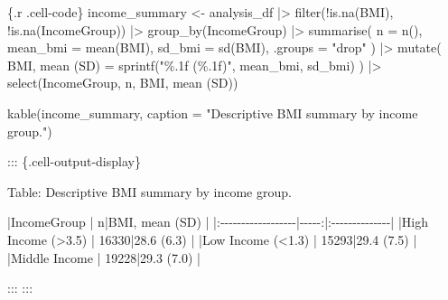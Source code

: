 \documentclass[
  letterpaper,
  DIV=11,
  numbers=noendperiod,
  oneside]{scrreprt}
\newenvironment{Shaded}{\begin{snugshade}}{\end{snugshade}}
\newcommand{\AttributeTok}[1]{\textcolor[rgb]{0.40,0.45,0.13}{#1}}
\newcommand{\FunctionTok}[1]{\textcolor[rgb]{0.28,0.35,0.67}{#1}}
\newcommand{\InformationTok}[1]{\textcolor[rgb]{0.37,0.37,0.37}{#1}}
\newcommand{\NormalTok}[1]{\textcolor[rgb]{0.00,0.23,0.31}{#1}}
\newcommand{\OtherTok}[1]{\textcolor[rgb]{0.00,0.23,0.31}{#1}}
\newcommand{\PreprocessorTok}[1]{\textcolor[rgb]{0.68,0.00,0.00}{#1}}
\newcommand{\SpecialCharTok}[1]{\textcolor[rgb]{0.37,0.37,0.37}{#1}}
\newcommand{\StringTok}[1]{\textcolor[rgb]{0.13,0.47,0.30}{#1}}
\begin{document}
\begin{Shaded}
\begin{Highlighting}[numbers=left,,]
\InformationTok{\textasciigrave{}\textasciigrave{}\textasciigrave{}\{.r .cell{-}code\}}
\NormalTok{income\_summary }\OtherTok{\textless{}{-}}\NormalTok{ analysis\_df }\SpecialCharTok{|\textgreater{}}
  \FunctionTok{filter}\NormalTok{(}\SpecialCharTok{!}\FunctionTok{is.na}\NormalTok{(BMI), }\SpecialCharTok{!}\FunctionTok{is.na}\NormalTok{(IncomeGroup)) }\SpecialCharTok{|\textgreater{}}
  \FunctionTok{group\_by}\NormalTok{(IncomeGroup) }\SpecialCharTok{|\textgreater{}}
  \FunctionTok{summarise}\NormalTok{(}
    \AttributeTok{n =} \FunctionTok{n}\NormalTok{(),}
    \AttributeTok{mean\_bmi =} \FunctionTok{mean}\NormalTok{(BMI),}
    \AttributeTok{sd\_bmi =} \FunctionTok{sd}\NormalTok{(BMI),}
    \AttributeTok{.groups =} \StringTok{"drop"}
\NormalTok{  ) }\SpecialCharTok{|\textgreater{}}
  \FunctionTok{mutate}\NormalTok{(}
    \StringTok{\textasciigrave{}}\AttributeTok{BMI, mean (SD)}\StringTok{\textasciigrave{}} \OtherTok{=} \FunctionTok{sprintf}\NormalTok{(}\StringTok{"\%.1f (\%.1f)"}\NormalTok{, mean\_bmi, sd\_bmi)}
\NormalTok{  ) }\SpecialCharTok{|\textgreater{}}
  \FunctionTok{select}\NormalTok{(IncomeGroup, n, }\StringTok{\textasciigrave{}}\AttributeTok{BMI, mean (SD)}\StringTok{\textasciigrave{}}\NormalTok{)}

\FunctionTok{kable}\NormalTok{(income\_summary, }\AttributeTok{caption =} \StringTok{"Descriptive BMI summary by income group."}\NormalTok{)}
\InformationTok{\textasciigrave{}\textasciigrave{}\textasciigrave{}}

\NormalTok{::: \{.cell{-}output{-}display\}}


\NormalTok{Table: Descriptive BMI summary by income group.}

\PreprocessorTok{|}\NormalTok{IncomeGroup        }\PreprocessorTok{|}\NormalTok{     n}\PreprocessorTok{|}\NormalTok{BMI, mean (SD) }\PreprocessorTok{|}
\PreprocessorTok{|:{-}{-}{-}{-}{-}{-}{-}{-}{-}{-}{-}{-}{-}{-}{-}{-}{-}{-}|{-}{-}{-}{-}{-}:|:{-}{-}{-}{-}{-}{-}{-}{-}{-}{-}{-}{-}{-}{-}|}
\PreprocessorTok{|}\NormalTok{High Income (\textgreater{}3.5) }\PreprocessorTok{|}\NormalTok{ 16330}\PreprocessorTok{|}\NormalTok{28.6 (6.3)     }\PreprocessorTok{|}
\PreprocessorTok{|}\NormalTok{Low Income (\textless{}1.3)  }\PreprocessorTok{|}\NormalTok{ 15293}\PreprocessorTok{|}\NormalTok{29.4 (7.5)     }\PreprocessorTok{|}
\PreprocessorTok{|}\NormalTok{Middle Income      }\PreprocessorTok{|}\NormalTok{ 19228}\PreprocessorTok{|}\NormalTok{29.3 (7.0)     }\PreprocessorTok{|}


\NormalTok{:::}
\NormalTok{:::}




\end{Highlighting}
\end{Shaded}
\end{document}

